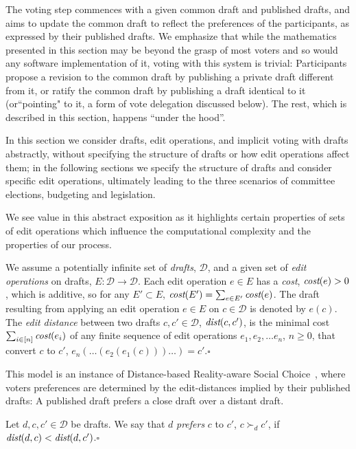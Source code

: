 \documentclass{llncs}
\newcommand{\qqed}{\hfill$\square$}
\newcommand{\calD}{\mathcal{D}}
\newcommand{\prefers}[1]{\succ_{#1}}
\newcommand{\dist}{\emph{dist}}
\newcommand{\cost}{\emph{cost}}
\begin{document}
The voting step commences with a given common draft and published drafts, and aims to update the common draft to reflect the preferences of the participants, as expressed by their published drafts. We emphasize that while the mathematics presented in this section may be beyond the grasp of most voters and so would any software implementation of it, voting with this system is trivial:  Participants propose a revision to the common draft by publishing a private draft different from it, or ratify the common draft by publishing a draft identical to it (or``pointing" to it, a form of vote delegation discussed below).  The rest, which is described in this section, happens ``under the hood''.

In this section we consider drafts, edit operations, and implicit voting with drafts abstractly, without specifying the structure of drafts or how edit operations affect them; in the following sections we specify the structure of drafts and consider specific edit operations, ultimately leading to the three scenarios of committee elections, budgeting and legislation.

 We see value in this abstract exposition as it highlights certain properties of sets of edit operations which influence the computational complexity and the properties of our process.

\begin{definition}
%
We assume a potentially infinite set of \emph{drafts}, $\calD$, and a given set of \emph{edit operations} on drafts, $E: \calD \rightarrow \calD$. Each edit operation $e \in E$ has a \emph{cost}, $\cost(e) > 0$,  which is additive, so for any $E' \subset E$, $\cost(E') = \sum_{e \in E'} \cost(e)$. The draft resulting from applying an edit operation $e \in E$ on  $c \in \calD$ is denoted by $e(c)$.  The \emph{edit distance} between two drafts $c, c' \in \calD$, $\dist(c, c')$, is the minimal cost $\sum_{i \in [n]} \cost(e_i)$ of any finite sequence of edit operations $e_1, e_2, \ldots e_n$, $n \ge 0$, that convert $c$  to $c'$, $e_n(\ldots(e_2(e_1(c)))\ldots) = c'$.\qqed  
%
\end{definition}

This model is an instance of Distance-based Reality-aware Social Choice~\cite{realsoc}, where voters preferences are determined by the edit-distances implied by their published drafts:  A published draft prefers a close draft over a distant draft.

\begin{definition}[Prefers]\label{lemma:prefers}
%
Let $d, c, c' \in \calD$ be drafts.  We say that  $d$ \emph{prefers}  $c$ to $c'$, $ c \prefers{d} c'$, if $\dist(d, c) < \dist(d, c')$.\qqed
\end{definition}
\end{document}
